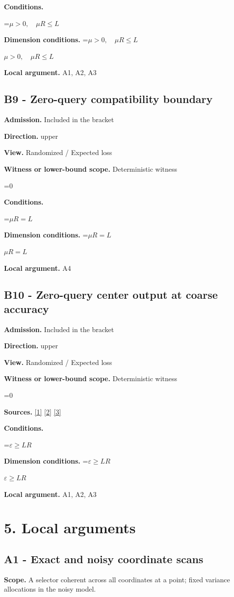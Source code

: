 \documentclass[10pt,a4paper]{article}
\newcommand{\AtlasMath}[1]{\par\begingroup\centering\setbox0=\hbox{$\displaystyle #1$}\ifdim\wd0>1.4\linewidth\typeout{ATLAS WIDE FORMULA: \the\wd0}\fi\ifdim\wd0>\linewidth\resizebox{\linewidth}{!}{\box0}\else\box0\fi\par\endgroup}
\newcommand{\AtlasInlineMath}[1]{\begingroup\setbox0=\hbox{$#1$}\ifdim\wd0>.4\linewidth\endgroup\AtlasMath{#1}\else\endgroup$#1$\fi}
\begin{document}
\textbf{Conditions.} 
\AtlasMath{\mu>0,\quad\mu R\le L}


\textbf{Dimension conditions.} \AtlasInlineMath{\mu>0,\quad\mu R\le L}

\textbf{Local argument.} A1, A2, A3

\subsection{B9 - Zero-query compatibility boundary}
\textbf{Admission.} Included in the bracket

\textbf{Direction.} upper

\textbf{View.} Randomized / Expected loss

\textbf{Witness or lower-bound scope.} Deterministic witness

\AtlasMath{0}
\textbf{Conditions.} 
\AtlasMath{\mu R=L}


\textbf{Dimension conditions.} \AtlasInlineMath{\mu R=L}

\textbf{Local argument.} A4

\subsection{B10 - Zero-query center output at coarse accuracy}
\textbf{Admission.} Included in the bracket

\textbf{Direction.} upper

\textbf{View.} Randomized / Expected loss

\textbf{Witness or lower-bound scope.} Deterministic witness

\AtlasMath{0}
\textbf{Sources.} \href{https://arxiv.org/pdf/1405.4980}{[1]} \href{https://www2.isye.gatech.edu/~nemirovs/MOR_AccuracyCertificates.pdf}{[2]} \href{https://arxiv.org/pdf/2609.20701}{[3]}

\textbf{Conditions.} 
\AtlasMath{\varepsilon\ge LR}


\textbf{Dimension conditions.} \AtlasInlineMath{\varepsilon\ge LR}

\textbf{Local argument.} A1, A2, A3

\section{5. Local arguments}
\subsection{A1 - Exact and noisy coordinate scans}
\textbf{Scope.} A selector coherent across all coordinates at a point; fixed variance allocations in the noisy model.
\end{document}
